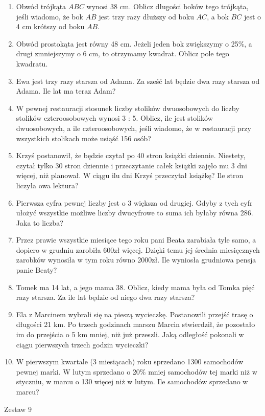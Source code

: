 \documentclass[12pt,a4paper]{article}
\begin{document}
\normalsize 
\begin{enumerate}[1.]
	\item Obwód trójkąta $ABC$ wynosi 38 cm. Oblicz długości boków tego trójkąta, jeśli wiadomo, że bok $AB$ jest trzy razy dłuższy od boku $AC$, a bok $BC$ jest o 4 cm krótszy od boku $AB$.
	\item Obwód prostokąta jest równy 48 cm. Jeżeli jeden bok zwiększymy o 25\%, a drugi zmniejszymy o 6 cm, to otrzymamy kwadrat. Oblicz pole tego kwadratu.
	\item Ewa jest trzy razy starsza od Adama. Za sześć lat będzie dwa razy starsza od Adama. Ile lat ma teraz Adam?
	\item W pewnej restauracji stosunek liczby stolików dwuosobowych do liczby stolików czteroosobowych wynosi 3 : 5. Oblicz, ile jest stolików dwuosobowych, a ile czteroosobowych, jeśli wiadomo, że w restauracji przy wszystkich stolikach może usiąść 156 osób?
	\item Krzyś postanowił, że będzie czytał po 40 stron książki dziennie. Niestety, czytał tylko 30 stron dziennie i przeczytanie całek książki zajęło mu 3 dni więcej, niż planował. W ciągu ilu dni Krzyś przeczytał książkę? Ile stron liczyła owa lektura?
	\item Pierwsza cyfra pewnej liczby jest o 3 większa od drugiej. Gdyby z tych cyfr ułożyć wszystkie możliwe liczby dwucyfrowe to suma ich byłaby równa 286. Jaka to liczba?
	\item Przez prawie wszystkie miesiące tego roku pani Beata zarabiała tyle samo, a dopiero w grudniu zarobiła 600zł więcej. Dzięki temu jej średnia miesięcznych zarobków wynosiła w tym roku równo 2000zł. Ile wyniosła grudniowa pensja panie Beaty?
	\item Tomek ma 14 lat, a jego mama 38. Oblicz, kiedy mama była od Tomka pięć razy starsza. Za ile lat będzie od niego dwa razy starsza?
		\item Ela z Marcinem wybrali się na pieszą wycieczkę. Postanowili przejść trasę o długości 21 km. Po trzech godzinach marszu Marcin stwierdził, że pozostało im do przejścia o 5 km mniej, niż już przeszli. Jaką odległość pokonali w ciągu pierwszych trzech godzin wycieczki?
		\item W pierwszym kwartale (3 miesiącach) roku sprzedano 1300 samochodów pewnej marki. W lutym sprzedano o 20\% mniej samochodów tej marki niż w styczniu, w marcu o 130 więcej niż w lutym. Ile samochodów sprzedano w marcu?
\end{enumerate}
\newpage
\LARGE \begin{center}
	Zestaw 9
\end{center}
\end{document}
